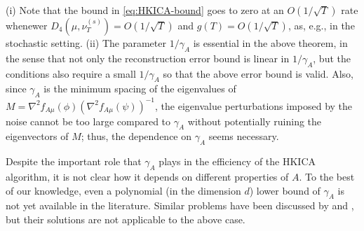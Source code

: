 \documentclass[twoside,11pt]{article}
\newcommand{\eps}{\epsilon}
\begin{document}
\fi
\begin{remark}
(i) Note that the bound in \eqref{eq:HKICA-bound} goes to zero at an $O(1/\sqrt{T})$ rate whenewer $D_4(\mu,\nu_T^{(s)})=O(1/\sqrt{T})$ and $g(T) =O(1/\sqrt{T}) $, as, e.g., in the stochastic setting.
(ii) The parameter $1/\gamma_A$ is essential in the above theorem, in the sense that not only the reconstruction error bound is linear in $1/\gamma_A$, but the conditions also require a small $1/\gamma_A$ so that the above error bound is valid. 
Also, since $\gamma_A$ is the minimum spacing of the eigenvalues of $M=\nabla^2 f_{A\mu}(\phi) (\nabla^2 f_{A\mu}(\psi))^{-1}$, the eigenvalue perturbations imposed by the noise cannot be too large compared to $\gamma_A$ without potentially  ruining the eigenvectors of $M$; thus, the dependence on $\gamma_A$ seems necessary.

\end{remark}

Despite the important role that $\gamma_A$ plays in the efficiency of the HKICA algorithm, it is not clear how it depends on different properties of $A$.
To the best of our knowledge, even a polynomial (in the dimension $d$) lower bound of $\gamma_A$ is not yet available in the literature. 
Similar problems have been discussed by  \citet{husler1987minimal} and \citet{goyal2014fourier}, but their solutions are not applicable to the above case.
\end{document}

